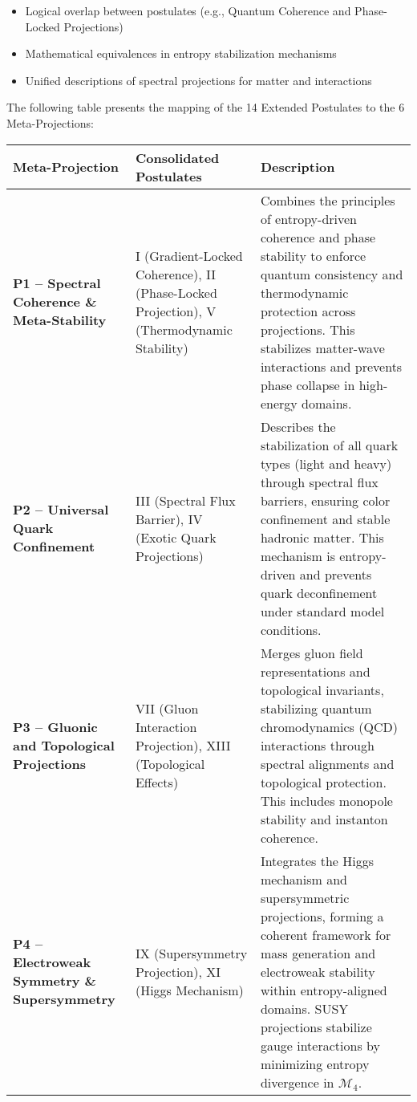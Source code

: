 \documentclass[10.5pt,a4paper]{article}
\begin{document}
\begin{itemize}
    \item Logical overlap between postulates (e.g., Quantum Coherence and Phase-Locked Projections)
    \item Mathematical equivalences in entropy stabilization mechanisms
    \item Unified descriptions of spectral projections for matter and interactions
\end{itemize}

The following table presents the mapping of the 14 Extended Postulates to the 6 Meta-Projections:
{\small
\begin{tabularx}{\textwidth}{>{\bfseries}p{4cm} p{5cm} X}
\toprule
\textbf{Meta-Projection} & \textbf{Consolidated Postulates} & \textbf{Description} \\
\midrule

P1 – Spectral Coherence \& Meta-Stability &
I (Gradient-Locked Coherence), II (Phase-Locked Projection), V (Thermodynamic Stability) &
Combines the principles of entropy-driven coherence and phase stability to enforce quantum consistency 
and thermodynamic protection across projections. This stabilizes matter-wave interactions and prevents phase collapse 
in high-energy domains. \\

P2 – Universal Quark Confinement &
III (Spectral Flux Barrier), IV (Exotic Quark Projections) &
Describes the stabilization of all quark types (light and heavy) through spectral flux barriers, 
ensuring color confinement and stable hadronic matter. This mechanism is entropy-driven and 
prevents quark deconfinement under standard model conditions. \\

P3 – Gluonic and Topological Projections &
VII (Gluon Interaction Projection), XIII (Topological Effects) &
Merges gluon field representations and topological invariants, stabilizing quantum chromodynamics (QCD) 
interactions through spectral alignments and topological protection. This includes monopole stability 
and instanton coherence. \\

P4 – Electroweak Symmetry \& Supersymmetry &
IX (Supersymmetry Projection), XI (Higgs Mechanism) &
Integrates the Higgs mechanism and supersymmetric projections, forming a coherent framework for mass 
generation and electroweak stability within entropy-aligned domains. SUSY projections stabilize gauge interactions 
by minimizing entropy divergence in \( \mathcal{M}_4 \). \\


\end{tabularx}}
\end{document}
